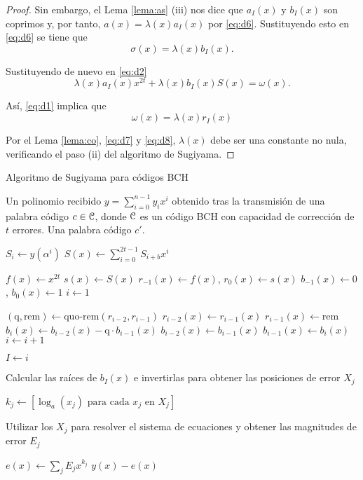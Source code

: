 \begin{proof}
Sin embargo, el Lema \ref{lema:as} (iii) nos dice que $a_I(x)$ y $b_I(x)$ son coprimos y, por tanto, $a(x) = \lambda(x)a_I(x)$ por \eqref{eq:d6}. Sustituyendo esto en \eqref{eq:d6} se tiene que 
\begin{equation}\label{eq:d7}
  \sigma(x) = \lambda(x)b_I(x).
\end{equation}

Sustituyendo de nuevo en \eqref{eq:d2} $$\lambda(x)a_I(x)x^{2t} + \lambda(x)b_I(x)S(x) = \omega(x).$$

Así, \eqref{eq:d1} implica que 
\begin{equation}\label{eq:d8}
  \omega(x) = \lambda(x)r_I(x)
\end{equation}

Por el Lema \ref{lema:co}, \eqref{eq:d7} y \eqref{eq:d8}, $\lambda(x)$ debe ser una constante no nula, verificando el paso (ii) del algoritmo de Sugiyama.
\end{proof}

\begin{algorithm}[H]
  \caption{Algoritmo de Sugiyama para códigos BCH}\label{SugiyamaBCH}
  \begin{algorithmic}[1]
  \REQUIRE Un polinomio recibido $y=\sum_{i=0}^{n-1}y_ix^i$ obtenido tras la transmisión de una palabra código $c \in \mathcal C$, donde $\mathcal C$ es un código BCH con capacidad de corrección de $t$ errores.
  \ENSURE Una palabra código $c'$.
  
      \STATE $S_i \gets y(\alpha^i)$
  \ENDFOR
  \STATE $S(x) \gets \sum_{i=0}^{2t-1} S_{i+b} x^i$
  
  \STATE $f(x) \gets x^{2t}$
  \STATE $s(x) \gets S(x)$
  \STATE $r_{-1}(x) \gets f(x)$, $r_0(x) \gets s(x)$
  \STATE $b_{-1}(x) \gets 0$, $b_0(x) \gets 1$
  \STATE $i \gets 1$

    \STATE $(\text{q}, \text{rem}) \gets \text{quo-rem}(r_{i-2},r_{i-1})$
    \STATE $r_{i-2}(x) \gets r_{i-1}(x)$
    \STATE $r_{i-1}(x) \gets \text{rem}$
    \STATE  $b_i(x) \gets b_{i-2}(x) - \text{q} \cdot b_{i-1}(x)$
    \STATE $b_{i-2}(x) \gets b_{i-1}(x)$
    \STATE $b_{i-1}(x) \gets b_i(x)$
    \STATE $i \gets i + 1$
  \ENDWHILE

  \STATE $I \gets i$

  \STATE Calcular las raíces de $b_I(x)$ e invertirlas para obtener las posiciones de error $X_j$
  
  \STATE $k_j \gets [\log_a(x_j) \text{ para cada } x_j \text{ en } X_j]$

  \STATE Utilizar los $X_j$ para resolver el sistema de ecuaciones y obtener las magnitudes de error $E_j$
  
  \STATE $e(x) \gets \sum_{j} E_j x^{k_j}$
  \RETURN $y(x) - e(x)$
  
  \end{algorithmic}
\end{algorithm}



